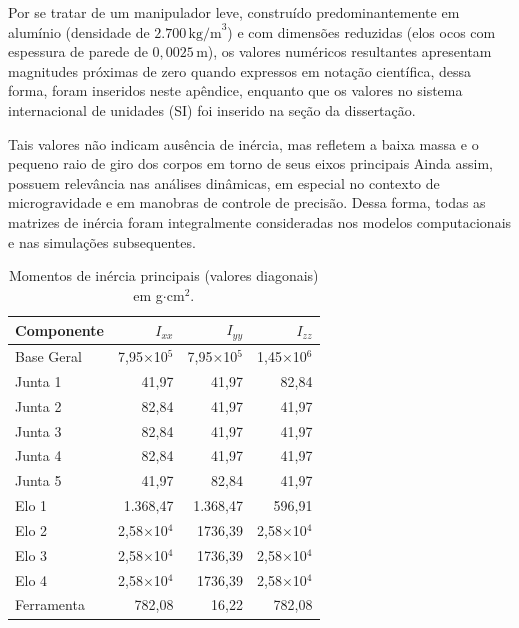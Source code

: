 Por se tratar de um manipulador leve, construído predominantemente em alumínio (densidade de $2.700\,\text{kg/m}^{3}$) e com dimensões reduzidas (elos ocos com espessura de parede de $0,0025\,\text{m}$), os valores numéricos resultantes apresentam magnitudes próximas de zero quando expressos em notação científica, dessa forma, foram inseridos neste apêndice, enquanto que os valores no sistema internacional de unidades (SI) foi inserido na seção da dissertação.

Tais valores não indicam ausência de inércia, mas refletem a baixa massa e o pequeno raio de giro dos corpos em torno de seus eixos principais
Ainda assim, possuem relevância nas análises dinâmicas, em especial no contexto de microgravidade e em manobras de controle de precisão.
Dessa forma, todas as matrizes de inércia foram integralmente consideradas nos modelos computacionais e nas simulações subsequentes.


\begin{table}[H]
\centering
\caption{Momentos de inércia principais (valores diagonais) em g$\cdot$cm$^{2}$.}
\label{tab:inercias_diag_gcm2}
\begin{tabular}{l rrr}
\hline
\textbf{Componente} & $I_{xx}$ & $I_{yy}$ & $I_{zz}$ \\
\hline
Base Geral   & 7,95$\times$10$^{5}$   & 7,95$\times$10$^{5}$   & 1,45$\times$10$^{6}$ \\
Junta 1      & 41,97                  & 41,97     & 82,84 \\
Junta 2      & 82,84                  & 41,97     & 41,97 \\
Junta 3      & 82,84                  & 41,97     & 41,97 \\
Junta 4      & 82,84                  & 41,97     & 41,97 \\
Junta 5      & 41,97                  & 82,84     & 41,97 \\
Elo 1        & 1.368,47               & 1.368,47  & 596,91 \\
Elo 2        & 2,58$\times$10$^{4}$   & 1736,39   & 2,58$\times$10$^{4}$ \\
Elo 3        & 2,58$\times$10$^{4}$   & 1736,39   & 2,58$\times$10$^{4}$ \\
Elo 4        & 2,58$\times$10$^{4}$   & 1736,39   & 2,58$\times$10$^{4}$ \\
Ferramenta   & 782,08   & 16,22    & 782,08 \\
\hline
\end{tabular}
\end{table}

